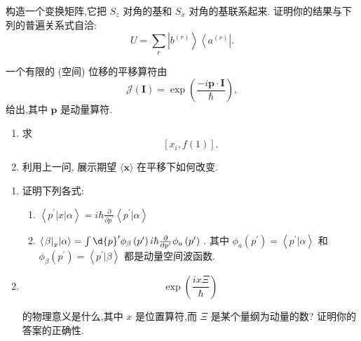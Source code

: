 \begin{problemset}
\begin{enumerate}
	\end{enumerate}
	\item 构造一个变换矩阵,它把 ${S}_{z}$ 对角的基和 ${S}_{x}$ 对角的基联系起来. 证明你的结果与下列的普遍关系式自洽:
	$$
	U = \mathop{\sum }\limits_{r}\left| {b}^{\left( r\right) }\right\rangle \left\langle {a}^{\left( r\right) }\right| .
	$$
	\item 一个有限的 (空间) 位移的平移算符由
	$$
	\mathcal{J}\left( \mathbf{I}\right) = \exp \left( \frac{-i\mathbf{p} \cdot \mathbf{I}}{\hbar }\right) ,
	$$
	给出,其中 $\mathbf{p}$ 是动量算符.
	\begin{enumerate}
		\item 求
		$$
		\left\lbrack {{x}_{i}, f\left( 1\right) }\right\rbrack \text{.}
		$$
		\item 利用上一问, 展示期望 $\langle \mathbf{x}\rangle$ 在平移下如何改变.
	\end{enumerate}
	\item 
	\begin{enumerate}
		\item 证明下列各式:
		\begin{enumerate}
			\item $\left\langle {{p}^{\prime }\left| x\right| \alpha }\right\rangle = i\hbar \frac{\partial }{\partial {p}^{\prime }}\left\langle {{p}^{\prime } | \alpha }\right\rangle$
			\item $\left\langle {{\left. \beta \right| }_{x} | \alpha }\right\rangle = \int \d{p}^{\prime }{\phi }_{\beta }\left( {p}^{\prime }\right) i\hbar \frac{\partial }{\partial {p}^{\prime }}{\phi }_{a}\left( {p}^{\prime }\right)$ . 其中 ${\phi }_{a}\left( {p}^{\prime }\right) = \left\langle {{p}^{\prime } | \alpha }\right\rangle$ 和 ${\phi }_{\beta }\left( {p}^{\prime }\right) = \left\langle {{p}^{\prime } | \beta }\right\rangle$ 都是动量空间波函数.
		\end{enumerate}
		\item $$
		\exp \left( \frac{ix\Xi }{\hbar }\right)
		$$
		
		的物理意义是什么,其中 $x$ 是位置算符,而 $\Xi$ 是某个量纲为动量的数? 证明你的答案的正确性.
	\end{enumerate}
\end{problemset}

	
	
	
	
	
	
\ifx\allfiles\undefined

	\else
	\fi
